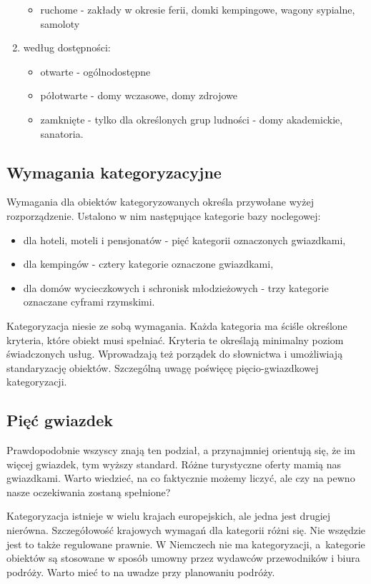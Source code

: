 \documentclass[a4paper,onecolumn,oneside,11pt,wide,floatssmall]{mwrep}
\theoremstyle{definition}
\theoremstyle{plain}%
\theoremstyle{remark}
\begin{document}
\begin{enumerate}
\begin{itemize}
      \item ruchome - zakłady w okresie ferii, domki kempingowe, wagony 
      sypialne, samoloty
    \end{itemize}
  \item według dostępności:
    \begin{itemize}
      \item otwarte - ogólnodostępne
      \item półotwarte - domy wczasowe, domy zdrojowe
      \item zamknięte - tylko dla określonych grup ludności - domy 
      akademickie, sanatoria.
    \end{itemize}
\end{enumerate}

\subsection{Wymagania kategoryzacyjne}
Wymagania dla obiektów kategoryzowanych określa przywołane wyżej rozporządzenie. 
Ustalono w nim następujące kategorie bazy noclegowej:

\begin{itemize}
  \item dla hoteli, moteli i pensjonatów - pięć kategorii oznaczonych 
  gwiazdkami,
  \item dla kempingów - cztery kategorie oznaczone gwiazdkami,
  \item dla domów wycieczkowych i schronisk młodzieżowych - trzy kategorie 
  oznaczane cyframi rzymskimi.
\end{itemize}

Kategoryzacja niesie ze sobą wymagania. Każda kategoria ma ściśle określone 
kryteria, które obiekt musi spełniać. Kryteria te określają minimalny poziom 
świadczonych usług. Wprowadzają też porządek do słownictwa i umożliwiają 
standaryzację obiektów. Szczególną uwagę poświęcę pięcio-gwiazdkowej 
kategoryzacji.

\subsection{Pięć gwiazdek}
Prawdopodobnie wszyscy znają ten podział, a przynajmniej orientują się, że im 
więcej gwiazdek, tym wyższy standard. Różne turystyczne oferty mamią nas 
gwiazdkami. Warto wiedzieć, na co faktycznie możemy liczyć, ale czy na pewno 
nasze oczekiwania zostaną spełnione? 

Kategoryzacja istnieje w wielu krajach 
europejskich, ale jedna jest drugiej nierówna. Szczegółowość krajowych wymagań dla 
kategorii różni się. Nie wszędzie jest to także regulowane 
prawnie. W Niemczech nie ma kategoryzacji, \mbox{a kategorie} obiektów są stosowane 
w sposób umowny przez wydawców przewodników i biura podróży. Warto mieć to 
na uwadze przy planowaniu podróży.
\end{document}
